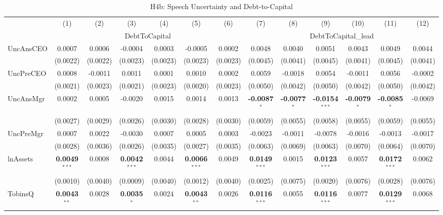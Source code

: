 \documentclass[11pt,a4paper]{article}
\begin{document}
\begin{table}[htbp]
\centering
\caption{H4b: Speech Uncertainty and Debt-to-Capital}
\label{tab:h4b}
\scriptsize
\begin{tabular}{lcccccccccccc}
\toprule
 & (1) & (2) & (3) & (4) & (5) & (6) & (7) & (8) & (9) & (10) & (11) & (12) \\
 & \multicolumn{6}{c}{DebtToCapital} & \multicolumn{6}{c}{DebtToCapital\_lead} \\
\cmidrule(lr){2-7} \cmidrule(lr){8-13}
\midrule
UncAnsCEO & 0.0007 & 0.0006 & -0.0004 & 0.0003 & -0.0005 & 0.0002 & 0.0048 & 0.0040 & 0.0051 & 0.0043 & 0.0049 & 0.0044 \\
 & (0.0022) & (0.0022) & (0.0023) & (0.0023) & (0.0023) & (0.0023) & (0.0045) & (0.0041) & (0.0045) & (0.0041) & (0.0045) & (0.0041) \\
UncPreCEO & 0.0008 & -0.0011 & 0.0011 & 0.0001 & 0.0010 & 0.0002 & 0.0059 & -0.0018 & 0.0054 & -0.0011 & 0.0056 & -0.0002 \\
 & (0.0021) & (0.0023) & (0.0021) & (0.0023) & (0.0020) & (0.0023) & (0.0050) & (0.0042) & (0.0050) & (0.0042) & (0.0050) & (0.0042) \\
UncAnsMgr & 0.0002 & 0.0005 & -0.0020 & 0.0015 & 0.0014 & 0.0013 & \textbf{-0.0087}$^{*}$ & \textbf{-0.0077}$^{*}$ & \textbf{-0.0154}$^{***}$ & \textbf{-0.0079}$^{*}$ & \textbf{-0.0085}$^{*}$ & -0.0069 \\
 & (0.0027) & (0.0029) & (0.0026) & (0.0030) & (0.0028) & (0.0030) & (0.0059) & (0.0055) & (0.0058) & (0.0055) & (0.0059) & (0.0055) \\
UncPreMgr & 0.0007 & 0.0022 & -0.0030 & 0.0007 & 0.0005 & 0.0003 & -0.0023 & -0.0011 & -0.0078 & -0.0016 & -0.0013 & -0.0017 \\
 & (0.0028) & (0.0036) & (0.0026) & (0.0035) & (0.0027) & (0.0035) & (0.0063) & (0.0069) & (0.0063) & (0.0070) & (0.0064) & (0.0070) \\
\midrule
lnAssets & \textbf{0.0049}$^{***}$ & 0.0008 & \textbf{0.0042}$^{***}$ & 0.0044 & \textbf{0.0066}$^{***}$ & 0.0049 & \textbf{0.0149}$^{***}$ & 0.0015 & \textbf{0.0123}$^{***}$ & 0.0057 & \textbf{0.0172}$^{***}$ & 0.0062 \\
 & (0.0010) & (0.0040) & (0.0009) & (0.0040) & (0.0012) & (0.0040) & (0.0025) & (0.0075) & (0.0020) & (0.0076) & (0.0028) & (0.0076) \\
TobinsQ & \textbf{0.0043}$^{**}$ & 0.0028 & \textbf{0.0035}$^{*}$ & 0.0024 & \textbf{0.0043}$^{**}$ & 0.0026 & \textbf{0.0116}$^{***}$ & 0.0055 & \textbf{0.0116}$^{***}$ & 0.0077 & \textbf{0.0129}$^{***}$ & 0.0068 \\

\end{tabular}
\end{table}
\end{document}
